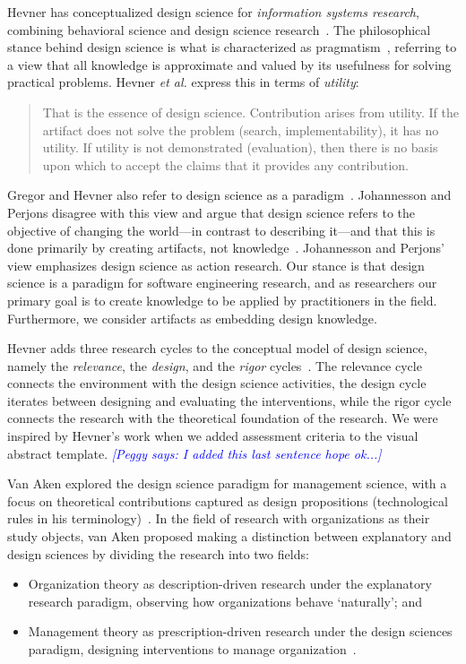 \documentclass[graybox]{svmult}
\newcommand{\peggy}[1]{\textcolor{blue}{{\it [Peggy says: #1]}}}
\newcommand{\peggy}[1]{}
\begin{document}
Hevner has conceptualized design science for \emph{information systems research}, combining behavioral science and design science research~\cite{hevner_design_2004,hevner_design_2010}.
The philosophical stance behind design science is what is characterized as pragmatism~\cite{easterbrook_selecting_2008}, referring to a view that all knowledge is approximate and valued by its usefulness for solving practical problems. Hevner \emph{et al.} express this in terms of \emph{utility}: 

\begin{quote}
	That is the essence of design science. Contribution arises from utility. If the artifact does not solve the problem (search, implementability), it has no utility. If utility is not demonstrated (evaluation), then there is no basis upon which to accept the claims that it provides any contribution.~\cite[p. 91]{hevner_design_2004}
\end{quote}


Gregor and Hevner also refer to design science as a paradigm~\cite{gregor_positioning_2013}. Johannesson and Perjons  disagree with this view and argue that design science refers to the objective of changing the world---in contrast to describing it---and that this is done primarily by creating artifacts, not knowledge~\cite{johannesson_introduction_2014}. Johannesson and Perjons' view emphasizes design science as action research. Our stance is that design science is a paradigm for software engineering research, and as researchers our primary goal is to create knowledge to be applied by practitioners in the field. Furthermore, we consider artifacts as embedding design knowledge. 

Hevner adds three research cycles to the conceptual model of design science, namely the \emph{relevance}, the \emph{design}, and the \emph{rigor} cycles~\cite{Hevner2007}. The relevance cycle connects the environment with the design science activities, the design cycle iterates between designing and evaluating the interventions, while the rigor cycle connects the research with the theoretical foundation of the research. We were inspired by Hevner's work when we added assessment criteria to the visual abstract template.
\peggy{I added this last sentence hope ok...}


Van Aken explored the design science paradigm for management science, with a focus on theoretical contributions captured as design propositions (technological rules in his terminology)~\cite{van_aken_management_2004,van_aken_management_2005}. 
In the field of research with organizations as their study objects, van Aken proposed making a distinction between explanatory and design sciences by dividing the research into two fields: 
\begin{itemize}
\item Organization theory as description-driven research under the explanatory research paradigm, observing how organizations behave `naturally'; and 
\item Management theory as prescription-driven research under the design sciences paradigm, designing interventions to manage organization~\cite{van_aken_management_2004}.  
\end{itemize}
\end{document}
